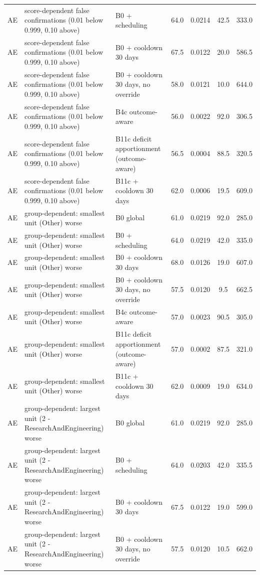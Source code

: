 \documentclass[10pt,onecolumn,letterpaper]{article}
\begin{document}
\begin{longtable}{lp{5.2cm}p{4.4cm}cccc}
AE & score-dependent false confirmations (0.01 below 0.999, 0.10 above) & B0 + scheduling & 64.0 & 0.0214 & 42.5 & 333.0 \\
AE & score-dependent false confirmations (0.01 below 0.999, 0.10 above) & B0 + cooldown 30 days & 67.5 & 0.0122 & 20.0 & 586.5 \\
AE & score-dependent false confirmations (0.01 below 0.999, 0.10 above) & B0 + cooldown 30 days, no override & 58.0 & 0.0121 & 10.0 & 644.0 \\
AE & score-dependent false confirmations (0.01 below 0.999, 0.10 above) & B4c outcome-aware & 56.0 & 0.0022 & 92.0 & 306.5 \\
AE & score-dependent false confirmations (0.01 below 0.999, 0.10 above) & B11c deficit apportionment (outcome-aware) & 56.5 & 0.0004 & 88.5 & 320.5 \\
AE & score-dependent false confirmations (0.01 below 0.999, 0.10 above) & B11c + cooldown 30 days & 62.0 & 0.0006 & 19.5 & 609.0 \\
AE & group-dependent: smallest unit (Other) worse & B0 global & 61.0 & 0.0219 & 92.0 & 285.0 \\
AE & group-dependent: smallest unit (Other) worse & B0 + scheduling & 64.0 & 0.0219 & 42.0 & 335.0 \\
AE & group-dependent: smallest unit (Other) worse & B0 + cooldown 30 days & 68.0 & 0.0126 & 19.0 & 607.0 \\
AE & group-dependent: smallest unit (Other) worse & B0 + cooldown 30 days, no override & 57.5 & 0.0120 & 9.5 & 662.5 \\
AE & group-dependent: smallest unit (Other) worse & B4c outcome-aware & 57.0 & 0.0023 & 90.5 & 305.0 \\
AE & group-dependent: smallest unit (Other) worse & B11c deficit apportionment (outcome-aware) & 57.0 & 0.0002 & 87.5 & 321.0 \\
AE & group-dependent: smallest unit (Other) worse & B11c + cooldown 30 days & 62.0 & 0.0009 & 19.0 & 634.0 \\
AE & group-dependent: largest unit (2 - ResearchAndEngineering) worse & B0 global & 61.0 & 0.0219 & 92.0 & 285.0 \\
AE & group-dependent: largest unit (2 - ResearchAndEngineering) worse & B0 + scheduling & 64.0 & 0.0203 & 42.0 & 335.5 \\
AE & group-dependent: largest unit (2 - ResearchAndEngineering) worse & B0 + cooldown 30 days & 67.5 & 0.0122 & 19.0 & 599.0 \\
AE & group-dependent: largest unit (2 - ResearchAndEngineering) worse & B0 + cooldown 30 days, no override & 57.5 & 0.0120 & 10.5 & 662.0 \\

\end{longtable}
\end{document}
